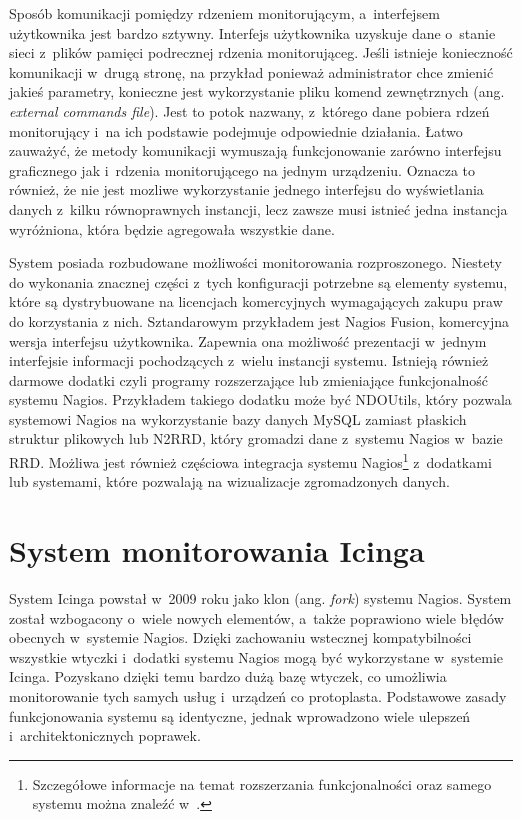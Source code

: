 Sposób komunikacji pomiędzy rdzeniem monitorującym, a~interfejsem
użytkownika jest bardzo sztywny. Interfejs użytkownika uzyskuje dane
o~stanie sieci z~plików pamięci podrecznej rdzenia
monitorująceg. Jeśli istnieje konieczność komunikacji w~drugą stronę,
na przykład ponieważ administrator chce zmienić jakieś parametry,
konieczne jest wykorzystanie pliku komend zewnętrznych (ang. {\em
  external commands file}). Jest to potok nazwany, z~którego dane
pobiera rdzeń monitorujący i~na ich podstawie podejmuje odpowiednie
działania. Łatwo zauważyć, że metody komunikacji wymuszają
funkcjonowanie zarówno interfejsu graficznego jak i~rdzenia
monitorującego na jednym urządzeniu. Oznacza to również, że nie jest
mozliwe wykorzystanie jednego interfejsu do wyświetlania danych
z~kilku równoprawnych instancji, lecz zawsze musi istnieć jedna
instancja wyróżniona, która będzie agregowała wszystkie dane.

System posiada rozbudowane możliwości monitorowania
rozproszonego. Niestety do wykonania znacznej części z~tych
konfiguracji potrzebne są elementy systemu, które są dystrybuowane na
licencjach komercyjnych wymagających zakupu praw do korzystania z
nich. Sztandarowym przykładem jest Nagios Fusion, komercyjna
wersja interfejsu użytkownika. Zapewnia ona możliwość prezentacji
w~jednym interfejsie informacji pochodzących z~wielu instancji
systemu. Istnieją również darmowe dodatki czyli programy rozszerzające
lub zmieniające funkcjonalność systemu Nagios. Przykładem takiego
dodatku może być NDOUtils, który pozwala systemowi Nagios na
wykorzystanie bazy danych MySQL zamiast płaskich struktur plikowych
lub N2RRD, który gromadzi dane z~systemu Nagios w~bazie RRD. Możliwa
jest również częściowa integracja systemu Nagios\footnote{Szczegółowe
  informacje na temat rozszerzania funkcjonalności oraz samego systemu
  można znaleźć w~\cite{www:Nagios}.}  z~dodatkami lub systemami,
które pozwalają na wizualizacje zgromadzonych danych.

\section[Icinga][System monitorowania Icinga]{System monitorowania Icinga}
\label{subsec:Icinga}

System Icinga powstał w~2009 roku jako klon (ang. {\em fork}) systemu
Nagios. System został wzbogacony o~wiele nowych elementów, a~także
poprawiono wiele błędów obecnych w~systemie Nagios. Dzięki zachowaniu
wstecznej kompatybilności wszystkie wtyczki i~dodatki systemu Nagios
mogą być wykorzystane w~systemie Icinga. Pozyskano dzięki temu bardzo
dużą bazę wtyczek, co umożliwia monitorowanie tych samych usług
i~urządzeń co protoplasta. Podstawowe zasady funkcjonowania systemu są
identyczne, jednak wprowadzono wiele ulepszeń i~architektonicznych
poprawek.

